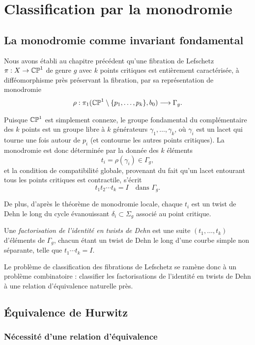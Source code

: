\chapter{Classification par la monodromie}

\section{La monodromie comme invariant fondamental}

Nous avons établi au chapitre précédent qu'une fibration de Lefschetz $\pi: X \to \mathbb{CP}^1$ de genre $g$ avec $k$ points critiques est entièrement caractérisée, à difféomorphisme près préservant la fibration, par sa représentation de monodromie
\[
\rho: \pi_1(\mathbb{CP}^1 \setminus \{p_1,\dots,p_k\}, b_0) \longrightarrow \Gamma_g.
\]

Puisque $\mathbb{CP}^1$ est simplement connexe, le groupe fondamental du complémentaire des $k$ points est un groupe libre à $k$ générateurs $\gamma_1,\dots,\gamma_k$, où $\gamma_i$ est un lacet qui tourne une fois autour de $p_i$ (et contourne les autres points critiques). La monodromie est donc déterminée par la donnée des $k$ éléments
\[
t_i = \rho(\gamma_i) \in \Gamma_g,
\]
et la condition de compatibilité globale, provenant du fait qu'un lacet entourant tous les points critiques est contractile, s'écrit
\[
t_1 t_2 \cdots t_k = I \quad \text{dans } \Gamma_g.
\]

De plus, d'après le théorème de monodromie locale, chaque $t_i$ est un twist de Dehn le long du cycle évanouissant $\delta_i \subset \Sigma_g$ associé au point critique.

\begin{definition}
Une \emph{factorisation de l'identité en twists de Dehn} est une suite $(t_1,\dots,t_k)$ d'éléments de $\Gamma_g$, chacun étant un twist de Dehn le long d'une courbe simple non séparante, telle que $t_1 \cdots t_k = I$.
\end{definition}

Le problème de classification des fibrations de Lefschetz se ramène donc à un problème combinatoire : classifier les factorisations de l'identité en twists de Dehn à une relation d'équivalence naturelle près.

\section{Équivalence de Hurwitz}

\subsection{Nécessité d'une relation d'équivalence}

